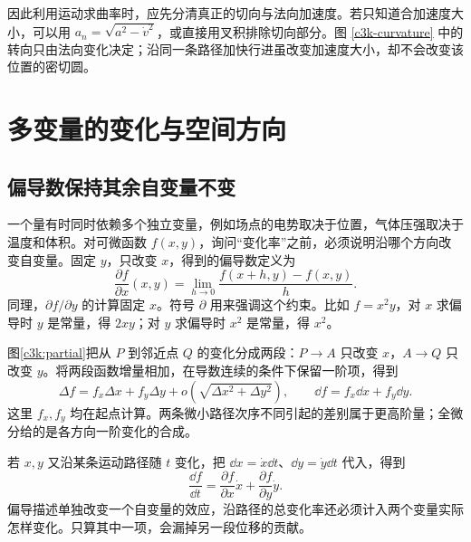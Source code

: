 因此利用运动求曲率时，应先分清真正的切向与法向加速度。若只知道合加速度大小，可以用 $a_n=\sqrt{a^2-\dot v^2}$，或直接用叉积排除切向部分。图 \ref{c3k-curvature} 中的转向只由法向变化决定；沿同一条路径加快行进虽改变加速度大小，却不会改变该位置的密切圆。


\section{多变量的变化与空间方向}
\subsection{偏导数保持其余自变量不变}
一个量有时同时依赖多个独立变量，例如场点的电势取决于位置，气体压强取决于温度和体积。对可微函数 $f(x,y)$，询问“变化率”之前，必须说明沿哪个方向改变自变量。固定 $y$，只改变 $x$，得到的偏导数定义为
\[
\frac{\partial f}{\partial x}(x,y)
=\lim_{h\to0}\frac{f(x+h,y)-f(x,y)}h.
\]
同理，$\partial f/\partial y$ 的计算固定 $x$。符号 $\partial$ 用来强调这个约束。比如 $f=x^2y$，对 $x$ 求偏导时 $y$ 是常量，得 $2xy$；对 $y$ 求偏导时 $x^2$ 是常量，得 $x^2$。

图\ref{c3k:partial}把从 $P$ 到邻近点 $Q$ 的变化分成两段：$P\to A$ 只改变 $x$，$A\to Q$ 只改变 $y$。将两段函数增量相加，在导数连续的条件下保留一阶项，得到
\[
\Delta f=f_x\Delta x+f_y\Delta y
 +o\!\left(\sqrt{\Delta x^2+\Delta y^2}\right),\qquad
\dd f=f_x\dd x+f_y\dd y.
\]
这里 $f_x,f_y$ 均在起点计算。两条微小路径次序不同引起的差别属于更高阶量；全微分给的是各方向一阶变化的合成。

若 $x,y$ 又沿某条运动路径随 $t$ 变化，把 $\dd x=\dot x\dd t$、$\dd y=\dot y\dd t$ 代入，得到
\[
\frac{\dd f}{\dd t}=\frac{\partial f}{\partial x}\dot x
 +\frac{\partial f}{\partial y}\dot y.
\]
偏导描述单独改变一个自变量的效应，沿路径的总变化率还必须计入两个变量实际怎样变化。只算其中一项，会漏掉另一段位移的贡献。

